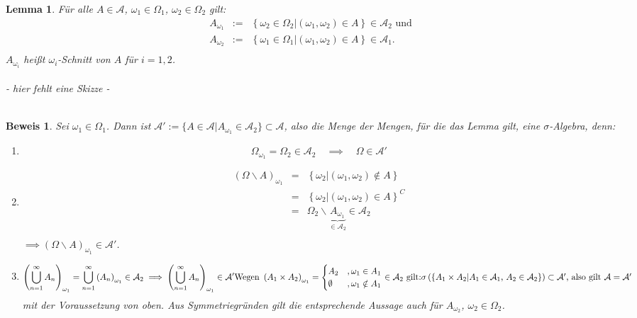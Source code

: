 \documentclass[a4paper,11pt]{scrbook}
\def\AA{ \mathcal{A} }
\def\folgt{\ensuremath{\implies}}
\newtheorem{Lem}{Lemma}[chapter]
\theoremstyle{nonumberplain}
\newtheorem{Bew}{Beweis}
\begin{document}
\begin{Lem} \label{Lem3.1}Für alle $A\in\AA$, $\omega_1\in\Omega_1$, $\omega_2\in\Omega_2$ gilt: \\
\begin{eqnarray*}
A_{\omega_1} &:=& \left\{\omega_2\in\Omega_2|\left(\omega_1,\omega_2\right)\in A\right\}\in\AA_2 \text{ und} \\
A_{\omega_2} &:=& \left\{\omega_1\in\Omega_1|\left(\omega_1,\omega_2\right)\in A\right\}\in\AA_1 \text{.} \\
\end{eqnarray*}
$A_{\omega_i}$ heißt $\omega_i$-Schnitt von $A$ für $i=1,2$. \\
\quad\\
- hier fehlt eine Skizze - \\ %
\quad\\
\end{Lem}
\begin{Bew} Sei $\omega_1\in\Omega_1$. Dann ist $\AA':=\{A\in\AA|A_{\omega_1}\in\AA_2\}\subset\AA$, also die Menge der Mengen, für die das Lemma gilt, eine $\sigma$-Algebra, denn:
\begin{enumerate}
\item[(i)] \begin{displaymath} \Omega_{\omega_1}=\Omega_2\in\AA_2\quad\folgt\quad\Omega\in\AA' \end{displaymath}
\item[(ii)]\begin{eqnarray*}
\left(\Omega\backslash A\right)_{\omega_1} &=& \left\{\omega_2|\left(\omega_1,\omega_2\right)\notin A\right\} \\
 &=& \left\{\omega_2|\left(\omega_1,\omega_2\right)\in A\right\}^C \\
 &=& \Omega_2\backslash\underbrace{A_{\omega_1}}_{\in\AA_2}\in\AA_2 \\
\end{eqnarray*} $\folgt (\Omega\backslash A)_{\omega_1}\in\AA'$.
\item[(iii)]\begin{displaymath}
\left(\bigcup_{n=1}^{\infty}A_n\right)_{\omega_1} = \bigcup_{n=1}^{\infty}\left( A_n\right)_{\omega_1}\in\AA_2 \folgt \left(\bigcup_{n=1}^{\infty}A_n\right)_{\omega_1}\in\AA' $$\\$$
\text{Wegen }\left(A_1\times A_2\right)_{\omega_1}= 
\begin{cases}
A_2 & ,\omega_1\in A_1 \\
\emptyset & ,\omega_1\notin A_1 \\
\end{cases}
\in\AA_2 \text{ gilt:}$$\\$$
\sigma\left(\left\{A_1\times A_2|A_1\in\AA_1\text{, }A_2\in\AA_2\right\}\right)\subset\AA'\text{, also gilt }\AA=\AA'
\end{displaymath}
mit der Voraussetzung von oben. Aus Symmetriegründen gilt die entsprechende Aussage auch für $A_{\omega_2}$, $\omega_2\in\Omega_2$.
\end{enumerate}
\end{Bew}
\end{document}
